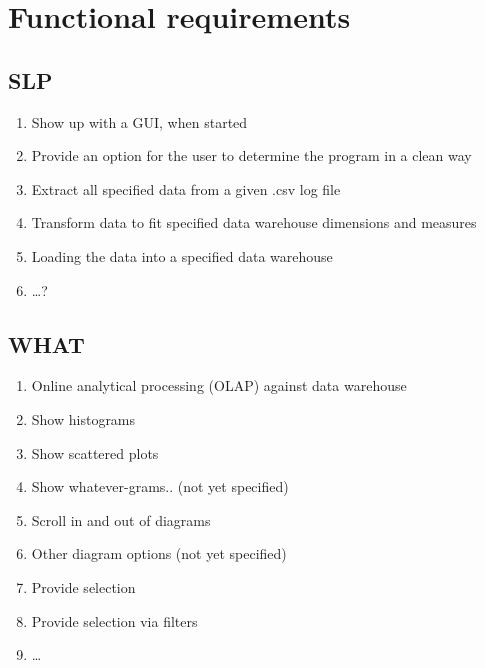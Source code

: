 \section{Functional requirements}

\renewcommand{\theenumi}{/F\arabic{enumi}0/}
\renewcommand{\labelenumi}{\theenumi}
 

\subsection{SLP}

\begin{enumerate}
  
  \item Show up with a GUI, when started
  
  \item Provide an option for the user to determine the program 
  	in a clean way
  	
  \item Extract all specified data from a given .csv log file
  
  \item Transform data to fit specified data warehouse dimensions
  	and measures
  
  \item Loading the data into a specified data warehouse
  	
  \item \ldots?
   
\end{enumerate}

\subsection{WHAT} 

\begin{enumerate}[resume]
  
  \item Online analytical processing (OLAP) against data warehouse
     
  \item Show histograms
  
  \item Show scattered plots
  
  \item Show whatever-grams.. (not yet specified) %
  
  \item Scroll in and out of diagrams
  
  \item Other diagram options (not yet specified)
  
  \item Provide selection 
  
  \item Provide selection via filters
  
  \item \ldots

\end{enumerate}